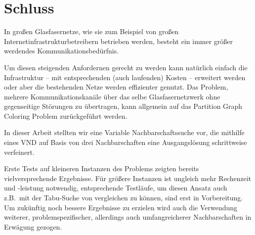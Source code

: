 \documentclass[paper=a4,fontsize=12pt]{scrartcl}
\begin{document}
\section{Schluss}
In großen Glasfasernetze, wie sie zum Beispiel von großen Internetinfrastrukturbetreibern betrieben werden, besteht ein immer größer werdendes Kommunikationsbedürfnis.

Um diesen steigenden Anfordernen gerecht zu werden kann natürlich einfach die Infrastruktur -- mit entsprechenden (auch laufenden) Kosten -- erweitert werden oder aber die bestehenden Netze werden effizienter genutzt. Das Problem, mehrere Kommunikationskanäle über das selbe Glasfasernetzwerk ohne gegenseitige Störungen zu übertragen, kann allgemein auf das Partition Graph Coloring Problem zurückgeführt werden.

In dieser Arbeit stellten wir eine Variable Nachbarschaftssuche vor, die mithilfe eines VND auf Basis von drei Nachbarschaften eine Ausgangslösung schrittweise verfeinert.

Erste Tests auf kleineren Instanzen des Problems zeigten bereits vielversprechende Ergebnisse. Für größere Instanzen ist ungleich mehr Rechenzeit und -leistung notwendig, entsprechende Testläufe, um diesen Ansatz auch z.B.\ mit der Tabu-Suche von \citet*{Noronha2006} vergleichen zu können, sind erst in Vorbereitung. Um zukünftig noch bessere Ergebnisse zu erzielen wird auch die Verwendung  weiterer, problemspezifischer, allerdings auch umfangreicherer Nachbarschaften in Erwägung gezogen.


\newpage
\printbibliography
{}
\listoffigures
{}
\listoftables
{}
\listofalgorithms
{}
\end{document}
